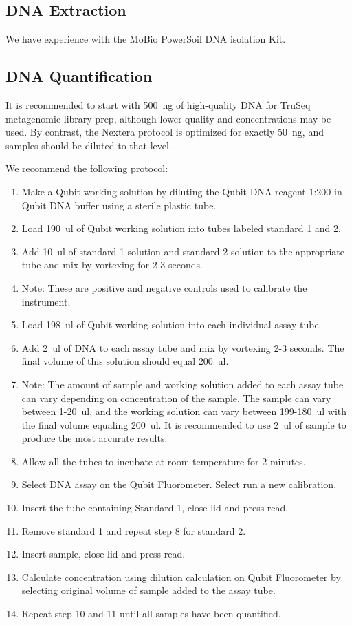 \documentclass[graybox]{svmult}
\begin{document}
\subsection{DNA Extraction}
We have experience with the MoBio PowerSoil DNA isolation Kit.  

\subsection{DNA Quantification}

It is recommended to start with 500~ng of high-quality DNA for TruSeq metagenomic library prep, although lower quality and concentrations may be used. By contrast, the Nextera protocol is optimized for exactly 50~ng, and samples should be diluted to that level.

We recommend the following protocol:
\begin{enumerate}
\item{     Make a Qubit working solution by diluting the Qubit DNA reagent 1:200 in Qubit DNA buffer using a sterile plastic tube.}
\item{       Load 190~ul of Qubit working solution into tubes labeled standard 1 and 2.}
\item{       Add 10~ul of standard 1 solution and standard 2 solution to the appropriate tube and mix by vortexing for 2-3 seconds.}
\item{         Note: These are positive and negative controls used to calibrate the instrument.}
\item{       Load 198~ul of Qubit working solution into each individual assay tube.}
\item{       Add 2~ul of DNA to each assay tube and mix by vortexing 2-3 seconds. The final volume of this solution should equal 200~ul.}
\item{        Note: The amount of sample and working solution added to each assay tube can vary depending on concentration of the sample. The sample can vary between 1-20~ul, and the working solution can vary between 199-180~ul with the final volume equaling 200~ul. It is recommended to use 2~ul of sample to produce the most accurate results.}
\item{       Allow all the tubes to incubate at room temperature for 2 minutes.}
\item{       Select DNA assay on the Qubit Fluorometer. Select run a new calibration.}
\item{       Insert the tube containing Standard 1, close lid and press read.}
\item{       Remove standard 1 and repeat step 8 for standard 2.}
\item{      Insert sample, close lid and press read.}
\item{      Calculate concentration using dilution calculation on Qubit Fluorometer by selecting original volume of sample added to the assay tube.}
\item{      Repeat step 10 and 11 until all samples have been quantified.}
\end{enumerate}
\end{document}
